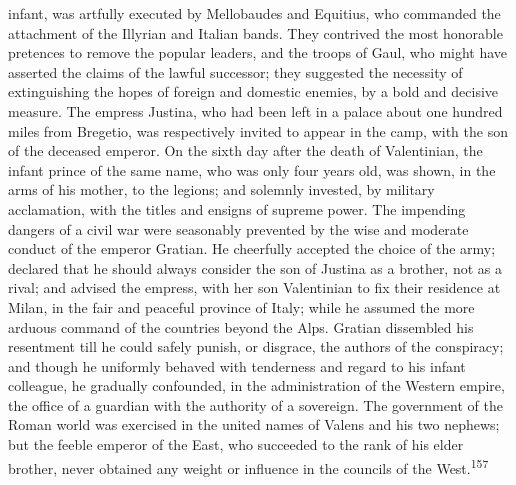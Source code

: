 infant, was artfully executed by Mellobaudes and Equitius, who
commanded the attachment of the Illyrian and Italian bands. They
contrived the most honorable pretences to remove the popular
leaders, and the troops of Gaul, who might have asserted the
claims of the lawful successor; they suggested the necessity of
extinguishing the hopes of foreign and domestic enemies, by a
bold and decisive measure. The empress Justina, who had been left
in a palace about one hundred miles from Bregetio, was
respectively invited to appear in the camp, with the son of the
deceased emperor. On the sixth day after the death of
Valentinian, the infant prince of the same name, who was only
four years old, was shown, in the arms of his mother, to the
legions; and solemnly invested, by military acclamation, with the
titles and ensigns of supreme power. The impending dangers of a
civil war were seasonably prevented by the wise and moderate
conduct of the emperor Gratian. He cheerfully accepted the choice
of the army; declared that he should always consider the son of
Justina as a brother, not as a rival; and advised the empress,
with her son Valentinian to fix their residence at Milan, in the
fair and peaceful province of Italy; while he assumed the more
arduous command of the countries beyond the Alps. Gratian
dissembled his resentment till he could safely punish, or
disgrace, the authors of the conspiracy; and though he uniformly
behaved with tenderness and regard to his infant colleague, he
gradually confounded, in the administration of the Western
empire, the office of a guardian with the authority of a
sovereign. The government of the Roman world was exercised in the
united names of Valens and his two nephews; but the feeble
emperor of the East, who succeeded to the rank of his elder
brother, never obtained any weight or influence in the councils
of the West.\textsuperscript{157}




